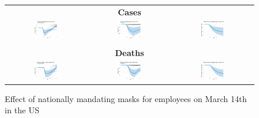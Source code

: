 \documentclass[3p, longtitle]{elsarticle}
\theoremstyle{definition}
\begin{document}
\begin{figure}[ht]
  \caption{Effect of nationally mandating masks for employees on March
    14th in the US\label{fig:US-mask}}
  \begin{minipage}{\linewidth}
    \centering
    \medskip
    \begin{tabular}{ccc}
      \multicolumn{3}{c}{\textbf{Cases}} \\
      \includegraphics[width=0.31\textwidth]{tables_and_figures/us-mask-dgrowth_idx}
      &
        \includegraphics[width=0.31\textwidth]{tables_and_figures/us-mask-dcases_idx}
      &
        \includegraphics[width=0.31\textwidth]{tables_and_figures/us-mask-rcumu_idx}
      \\
      \\
      \multicolumn{3}{c}{\textbf{Deaths}} \\
      \includegraphics[width=0.31\textwidth]{tables_and_figures/us-mask-dgrowth_deaths_idx}
      &
        \includegraphics[width=0.31\textwidth]{tables_and_figures/us-mask-dcases_deaths_idx}
     &
        \includegraphics[width=0.31\textwidth]{tables_and_figures/us-mask-rcumu_deaths_idx}
    \end{tabular}


\end{minipage}
\end{figure}
\end{document}
